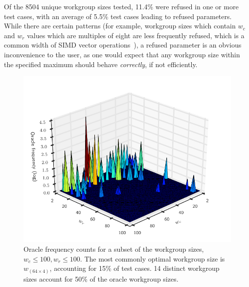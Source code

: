 \documentclass[nonatbib,preprint,10pt]{sigplanconf}
\begin{document}
Of the 8504 unique workgroup sizes tested, 11.4\% were refused in one
or more test cases, with an average of 5.5\% test cases leading to
refused parameters. While there are certain patterns (for example,
workgroup sizes which contain $w_c$ and $w_r$ values which are
multiples of eight are less frequently refused, which is a common
width of SIMD vector operations~\cite{IntelCorporation2012}), a
refused parameter is an obvious inconvenience to the user, as one
would expect that any workgroup size within the specified maximum
should behave \emph{correctly}, if not efficiently.

\begin{figure}
  \centering
  \includegraphics[width=\columnwidth]{img/oracle_param_space.pdf}
  \caption{%
    Oracle frequency counts for a subset of the workgroup sizes,
    $w_c \le 100, w_r \le 100$. The most commonly optimal workgroup
    size is $w_{(64 \times 4)}$, accounting for 15\% of test cases. 14
    distinct workgroup sizes account for 50\% of the oracle workgroup
    sizes.%
  }
\label{fig:oracle-wgsizes}
\end{figure}
\end{document}
